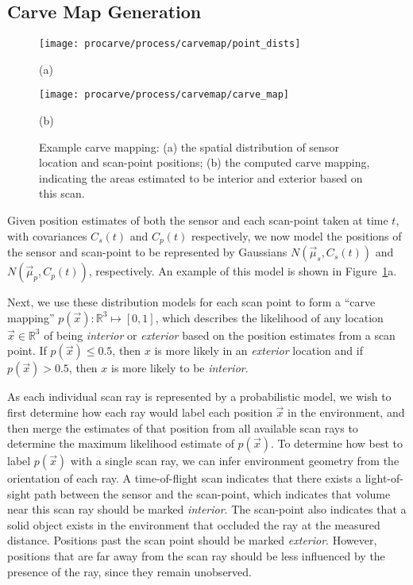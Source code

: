 \documentclass[12pt,onecolumn,oneside]{book}
\begin{document}
\subsection{Carve Map Generation}
\label{ssec:carve_map_generation}

\begin{figure}[t]
	\centering
	\begin{minipage}[t]{0.70\linewidth} %
		\centerline{\texttt{[image: procarve/process/carvemap/point\_dists]}}
		\centerline{(a)}
	\end{minipage}
	\hfill
	\begin{minipage}[t]{0.70\linewidth} %
		\centerline{\texttt{[image: procarve/process/carvemap/carve\_map]}}
		\centerline{(b)}
	\end{minipage}

	\caption[Example carve mapping.]{Example carve mapping: (a) the spatial distribution of sensor location and scan-point positions; (b) the computed carve mapping, indicating the areas estimated to be interior and exterior based on this scan.}
	\label{fig:carvemap}
\end{figure}

Given position estimates of both the sensor and each scan-point taken at time $t$, with covariances $C_s(t)$ and $C_p(t)$ respectively,  we now model the positions of the sensor and scan-point to be represented by Gaussians $N(\vec{\mu}_s,C_s(t))$ and $N(\vec{\mu}_p,C_p(t))$, respectively. An example of this model is shown in Figure~\ref{fig:carvemap}a.

Next, we use these distribution models for each scan point to form a ``carve mapping'' $p(\vec{x}) : \mathbb{R}^3 \mapsto [0,1]$, which describes the likelihood of any location $\vec{x} \in \mathbb{R}^3$ of being {\it interior} or {\it exterior} based on the position estimates from a scan point.  If $p(\vec{x}) \leq 0.5$, then $x$ is more likely in an {\it exterior} location and if $p(\vec{x}) > 0.5$, then $x$ is more likely to be {\it interior}.  

As each individual scan ray is represented by a probabilistic model, we wish to first determine how each ray would label each position $\vec{x}$ in the environment, and then merge the estimates of that position from all available scan rays to determine the maximum likelihood estimate of $p(\vec{x})$.  To determine how best to label $p(\vec{x})$ with a single scan ray, we can infer environment geometry from the orientation of each ray.  A time-of-flight scan indicates that there exists a light-of-sight path between the sensor and the scan-point, which indicates that volume near this scan ray should be marked {\it interior}.  The scan-point also indicates that a solid object exists in the environment that occluded the ray at the measured distance.  Positions past the scan point should be marked {\it exterior}.  However, positions that are far away from the scan ray should be less influenced by the presence of the ray, since they remain unobserved.  
\end{document}
